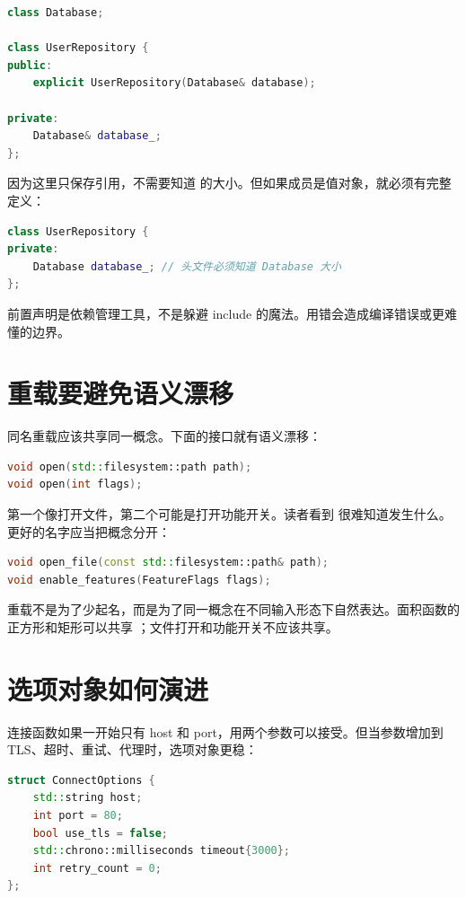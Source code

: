 \begin{lstlisting}[language=C++,caption={类指针可以前置声明}]
class Database;

class UserRepository {
public:
    explicit UserRepository(Database& database);

private:
    Database& database_;
};
\end{lstlisting}

因为这里只保存引用，不需要知道  的大小。但如果成员是值对象，就必须有完整定义：

\begin{lstlisting}[language=C++,caption={值成员需要完整定义}]
class UserRepository {
private:
    Database database_; // 头文件必须知道 Database 大小
};
\end{lstlisting}

前置声明是依赖管理工具，不是躲避 include 的魔法。用错会造成编译错误或更难懂的边界。

\section{重载要避免语义漂移}

同名重载应该共享同一概念。下面的接口就有语义漂移：

\begin{lstlisting}[language=C++,caption={同名函数语义不一致}]
void open(std::filesystem::path path);
void open(int flags);
\end{lstlisting}

第一个像打开文件，第二个可能是打开功能开关。读者看到  很难知道发生什么。更好的名字应当把概念分开：

\begin{lstlisting}[language=C++,caption={不同概念用不同名字}]
void open_file(const std::filesystem::path& path);
void enable_features(FeatureFlags flags);
\end{lstlisting}

重载不是为了少起名，而是为了同一概念在不同输入形态下自然表达。面积函数的正方形和矩形可以共享 ；文件打开和功能开关不应该共享。

\section{选项对象如何演进}

连接函数如果一开始只有 host 和 port，用两个参数可以接受。但当参数增加到 TLS、超时、重试、代理时，选项对象更稳：

\begin{lstlisting}[language=C++,caption={可演进的连接选项}]
struct ConnectOptions {
    std::string host;
    int port = 80;
    bool use_tls = false;
    std::chrono::milliseconds timeout{3000};
    int retry_count = 0;
};
\end{lstlisting}

